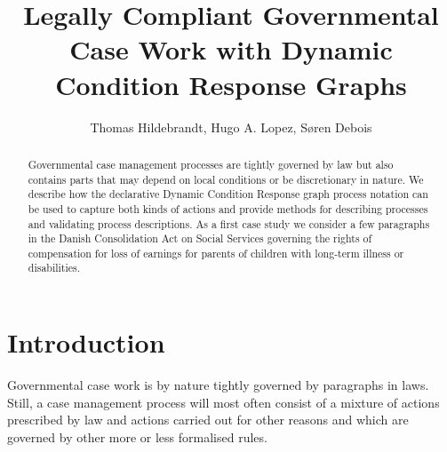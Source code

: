 \documentclass[envcountsame]{llncs}
\begin{document}
\pagestyle{headings}  %
%
\title{Legally Compliant Governmental Case Work with Dynamic Condition Response Graphs}
%
%
\author{Thomas Hildebrandt, Hugo A. Lopez, S\o ren Debois} 
%
%
%

\maketitle              %

\begin{abstract}
 Governmental case management processes are tightly governed by law but also contains parts that may depend on local conditions or be discretionary in nature. We describe how the declarative Dynamic Condition Response graph process notation can be used to capture both kinds of actions and provide methods for describing processes and validating process descriptions. As a first case study we consider a few paragraphs in the Danish Consolidation Act on Social Services governing the rights of compensation for loss of earnings for parents of children with long-term illness or disabilities.
\end{abstract}
%
\section{Introduction}
Governmental case work is by nature tightly governed by paragraphs in laws. Still, a case management process will most often consist of a mixture of actions prescribed by law and actions carried out for other reasons and which are governed by other more or less formalised rules.
\end{document}
